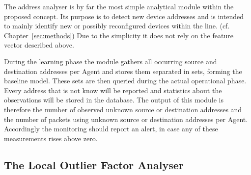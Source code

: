 The address analyser is by far the most simple analytical module within the proposed concept.
Its purpose is to detect new device addresses and is intended to mainly identify new or possibly reconfigured devices within the line. (cf. Chapter~\ref{sec:methods})
Due to the simplicity it does not rely on the feature vector described above.

During the learning phase the module gathers all occurring source and destination addresses per Agent and stores them separated in sets, forming the baseline model.
These sets are then queried during the actual operational phase. Every address that is not know will be reported and statistics about the observations will be stored in the database.
The output of this module is therefore the number of observed unknown source or destination addresses and the number of packets using unknown source or destination addresses per Agent.
Accordingly the monitoring should report an alert, in case any of these measurements rises above zero.

\subsection{The Local Outlier Factor Analyser}
\label{sec:concept:anal:lof}

